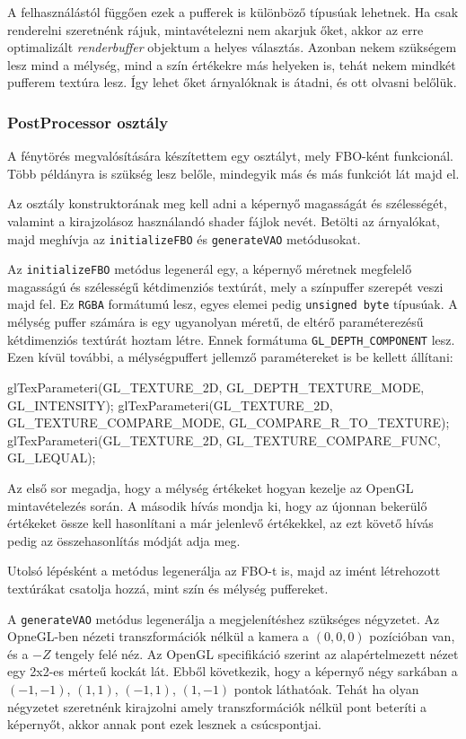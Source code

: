 A felhasználástól függően ezek a pufferek is különböző típusúak lehetnek. Ha csak renderelni szeretnénk rájuk, mintavételezni nem akarjuk őket, akkor az erre optimalizált \textit{renderbuffer} objektum a helyes választás. Azonban nekem szükségem lesz mind a mélység, mind a szín értékekre más helyeken is, tehát nekem mindkét pufferem textúra lesz. Így lehet őket árnyalóknak is átadni, és ott olvasni belőlük. 

\subsubsection{PostProcessor osztály}
A fénytörés megvalósítására készítettem egy osztályt, mely FBO-ként funkcionál. Több példányra is szükség lesz belőle, mindegyik más és más funkciót lát majd el.

Az osztály konstruktorának meg kell adni a képernyő magasságát és szélességét, valamint a kirajzolásoz használandó shader fájlok nevét. Betölti az árnyalókat, majd meghívja az \texttt{initializeFBO} és \texttt{generateVAO} metódusokat.

Az \texttt{initializeFBO} metódus legenerál egy, a képernyő méretnek megfelelő magasságú és szélességű kétdimenziós textúrát, mely a színpuffer szerepét veszi majd fel. Ez \texttt{RGBA} formátumú lesz, egyes elemei pedig \texttt{unsigned byte} típusúak. A mélység puffer számára is egy ugyanolyan méretű, de eltérő paraméterezésű kétdimenziós textúrát hoztam létre. Ennek formátuma \texttt{GL\_DEPTH\_COMPONENT} lesz. Ezen kívül további, a mélységpuffert jellemző paramétereket is be kellett állítani:
\begin{cpp}
glTexParameteri(GL_TEXTURE_2D, GL_DEPTH_TEXTURE_MODE, GL_INTENSITY);
glTexParameteri(GL_TEXTURE_2D, GL_TEXTURE_COMPARE_MODE, 
						GL_COMPARE_R_TO_TEXTURE);
glTexParameteri(GL_TEXTURE_2D, GL_TEXTURE_COMPARE_FUNC, GL_LEQUAL);
\end{cpp}
Az első sor megadja, hogy a mélység értékeket hogyan kezelje az OpenGL mintavételezés során. A második hívás mondja ki, hogy az újonnan bekerülő értékeket össze kell hasonlítani a már jelenlevő értékekkel, az ezt követő hívás pedig az összehasonlítás módját adja meg.

Utolsó lépésként a metódus legenerálja az FBO-t is, majd az imént létrehozott textúrákat csatolja hozzá, mint szín és mélység puffereket.

A \texttt{generateVAO} metódus legenerálja a megjelenítéshez szükséges négyzetet. Az OpneGL-ben nézeti transzformációk nélkül a kamera a $(0, 0, 0)$ pozícióban van, és a $-Z$ tengely felé néz. Az OpenGL specifikáció szerint az alapértelmezett nézet egy 2x2-es mérteű kockát lát. Ebből következik, hogy a képernyő négy sarkában a $(-1, -1)$, $(1, 1)$, $(-1, 1)$, $(1, -1)$ pontok láthatóak. Tehát ha olyan négyzetet szeretnénk kirajzolni amely transzformációk nélkül pont beteríti a képernyőt, akkor annak pont ezek lesznek a csúcspontjai.

